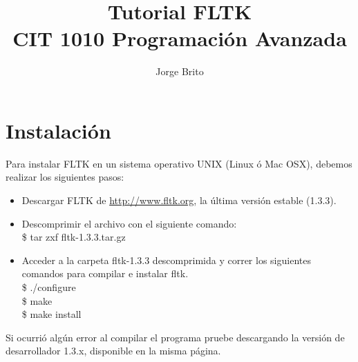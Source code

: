\documentclass[10pt, oneside]{article}   	%
\title{Tutorial FLTK \\ CIT 1010 Programación Avanzada}
\author{Jorge Brito}
\begin{document}
\maketitle



\section{Instalación}
Para instalar FLTK en un sistema operativo UNIX (Linux ó Mac OSX), debemos realizar los siguientes pasos:
\begin{itemize}
	\item{Descargar FLTK de \url{http://www.fltk.org}, la última versión estable (1.3.3).}
	\item{Descomprimir el archivo con el siguiente comando:\\ \$ tar zxf fltk-1.3.3.tar.gz}
	\item{Acceder a la carpeta fltk-1.3.3 descomprimida y correr los siguientes comandos para compilar e instalar fltk.\\
	\$ ./configure\\ \$ make \\ \$ make install}
\end{itemize}
Si ocurrió algún error al compilar el programa pruebe descargando la versión de desarrollador 1.3.x, disponible en la misma página.
\end{document}
